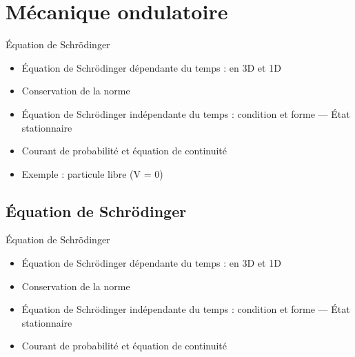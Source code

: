 \chapter{Mécanique ondulatoire} %
\label{chap:Mécanique ondulatoire}

\begin{tcolorbox}
Équation de Schrödinger

\begin{itemize}

    \item Équation de Schrödinger dépendante du temps : en 3D et 1D
    \item Conservation de la norme
    \item Équation de Schrödinger indépendante du temps : condition et forme — État stationnaire
    \item Courant de probabilité et équation de continuité
    \item Exemple : particule libre (V = 0)

\end{itemize}
\end{tcolorbox}

\newpage
\section{Équation de Schrödinger} %

\begin{tcolorbox}
Équation de Schrödinger
\begin{itemize}

    \item Équation de Schrödinger dépendante du temps : en 3D et 1D 
    \item Conservation de la norme 
    \item Équation de Schrödinger indépendante du temps : condition et forme — État stationnaire 
    \item Courant de probabilité et équation de continuité

\end{itemize}
\end{tcolorbox}

